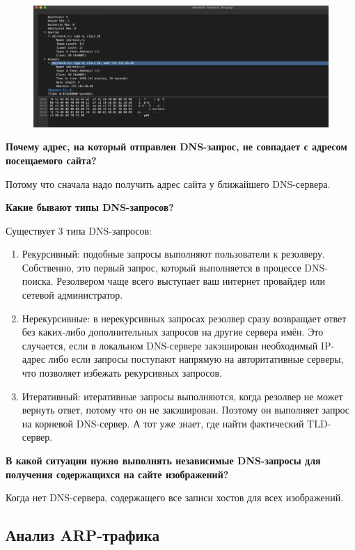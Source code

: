 \begin{figure}[H]
	\centering
	\includegraphics[width=0.7\linewidth]{"../Анализ трафика компьютерных сетей утилитой Wireshark/img/dns-2"}
	\caption{}
	\label{fig:dns-2}
\end{figure}

\textbf{Почему адрес, на который отправлен DNS-запрос, не совпадает с
адресом посещаемого сайта?}

Потому что сначала надо получить адрес сайта у ближайшего DNS-сервера.

\textbf{Какие бывают типы DNS-запросов?}

Существует 3 типа DNS-запросов:

\begin{enumerate}

	\item Рекурсивный: подобные запросы выполняют пользователи к резолверу. Собственно, это первый запрос, который выполняется в процессе DNS-поиска. Резолвером чаще всего выступает ваш интернет провайдер или сетевой администратор.
	
	\item Нерекурсивные: в нерекурсивных запросах резолвер сразу возвращает ответ без каких-либо дополнительных запросов на другие сервера имён. Это случается, если в локальном DNS-сервере закэширован необходимый IP-адрес либо если запросы поступают напрямую на авторитативные серверы, что позволяет избежать рекурсивных запросов.
	
	\item Итеративный: итеративные запросы выполняются, когда резолвер не может вернуть ответ, потому что он не закэширован. Поэтому он выполняет запрос на корневой DNS-сервер. А тот уже знает, где найти фактический TLD-сервер.
\end{enumerate}

\textbf{В какой ситуации нужно выполнять независимые DNS-запросы для
получения содержащихся на сайте изображений?}

Когда нет DNS-сервера, содержащего все записи хостов для всех изображений.


\subsection{Анализ ARP-трафика}

